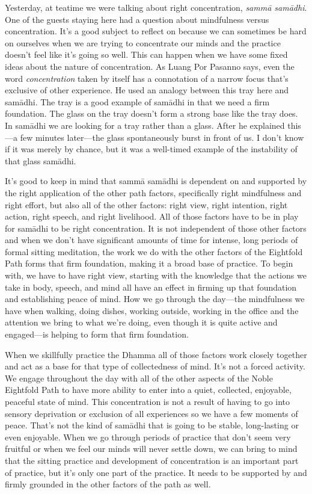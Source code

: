 
Yesterday, at teatime we were talking about right concentration, 
\emph{sammā samādhi}. One of the guests staying here had a question 
about mindfulness versus concentration. It's a good subject to reflect 
on because we can sometimes be hard on ourselves when we are trying to 
concentrate our minds and the practice doesn't feel like it's going so 
well. This can happen when we have some fixed ideas about the nature of 
concentration. As Luang Por Pasanno says, even the word 
\emph{concentration} taken by itself has a connotation of a narrow 
focus that's exclusive of other experience. He used an analogy between 
this tray here and samādhi. The tray is a good example of samādhi in 
that we need a firm foundation. The glass on the tray doesn't form a 
strong base like the tray does. In samādhi we are looking for a tray 
rather than a glass. After he explained this---a few minutes 
later---the glass spontaneously burst in front of us. I don't know if 
it was merely by chance, but it was a well-timed example of the 
instability of that glass samādhi.

It's good to keep in mind that sammā samādhi is dependent on and 
supported by the right application of the other path factors, 
specifically right mindfulness and right effort, but also all of the 
other factors: right view, right intention, right action, right speech, 
and right livelihood. All of those factors have to be in play for 
samādhi to be right concentration. It is not independent of those 
other factors and when we don't have significant amounts of time for 
intense, long periods of formal sitting meditation, the work we do with 
the other factors of the Eightfold Path forms that firm foundation, 
making it a broad base of practice. To begin with, we have to have 
right view, starting with the knowledge that the actions we take in 
body, speech, and mind all have an effect in firming up that foundation 
and establishing peace of mind. How we go through the day---the 
mindfulness we have when walking, doing dishes, working outside, 
working in the office and the attention we bring to what we're doing, 
even though it is quite active and engaged---is helping to form that 
firm foundation.

When we skillfully practice the Dhamma all of those factors work 
closely together and act as a base for that type of collectedness of 
mind. It's not a forced activity. We engage throughout the day with all 
of the other aspects of the Noble Eightfold Path to have more ability 
to enter into a quiet, collected, enjoyable, peaceful state of mind. 
This concentration is not a result of having to go into sensory 
deprivation or exclusion of all experiences so we have a few moments of 
peace. That's not the kind of samādhi that is going to be stable, 
long-lasting or even enjoyable. When we go through periods of practice 
that don't seem very fruitful or when we feel our minds will never 
settle down, we can bring to mind that the sitting practice and 
development of concentration is an important part of practice, but it's 
only one part of the practice. It needs to be supported by and firmly 
grounded in the other factors of the path as well.

